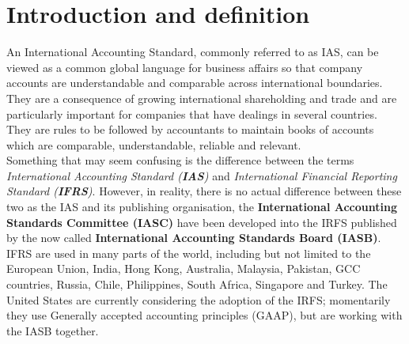 \section{Introduction and definition}
\label{sec:IntroductionAndDefinition}

An International Accounting Standard, commonly referred to as IAS, can be viewed as a common global language for business affairs so that company accounts are understandable and comparable across international boundaries. They are a consequence of growing international shareholding and trade and are particularly important for companies that have dealings in several countries. They are rules to be followed by accountants to maintain books of accounts which are comparable, understandable, reliable and relevant. \\

Something that may seem confusing is the difference between the terms \textit{International Accounting Standard (\textbf{IAS})} and \textit{International Financial Reporting Standard (\textbf{IFRS})}. However, in reality, there is no actual difference between these two as the IAS and its publishing organisation, the \textbf{International Accounting Standards Committee (IASC)} have been developed into the IRFS published by the now called \textbf{International Accounting Standards Board (IASB)}. \\

IFRS are used in many parts of the world, including but not limited to the European Union, India, Hong Kong, Australia, Malaysia, Pakistan, GCC countries, Russia, Chile, Philippines, South Africa, Singapore and Turkey. The United States are currently considering the adoption of the IRFS; momentarily they use Generally accepted accounting principles (GAAP), but are working with the IASB together.